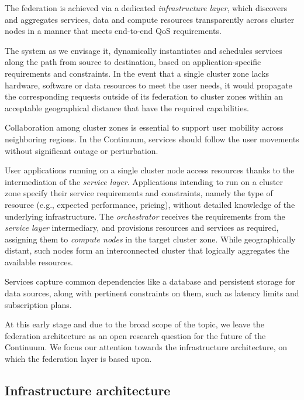 The federation is achieved via a dedicated \textit{infrastructure layer}, which discovers and aggregates services, data and compute resources transparently across cluster nodes in a manner that meets end-to-end QoS requirements.

The system as we envisage it, dynamically instantiates and schedules services along the path from source to destination, based on application-specific requirements and constraints. 
In the event that a single cluster zone lacks hardware, software or data resources to meet the user needs, it would propagate the corresponding requests outside of its federation to cluster zones within an acceptable geographical distance that have the required capabilities.

Collaboration among cluster zones is essential to support user mobility across neighboring regions. 
In the Continuum, services should follow the user movements without significant outage or perturbation.

User applications running on a single cluster node access resources thanks to the intermediation of the \textit{service layer}. Applications intending to run on a cluster zone specify their service requirements and constraints, namely the type of resource (e.g., expected performance, pricing), without detailed knowledge of the underlying infrastructure. 
The \textit{orchestrator} receives the requirements from the \textit{service layer} intermediary, and provisions resources and services as required, assigning them to \textit{compute nodes} in the target cluster zone.
While geographically distant, such nodes form an interconnected cluster that logically aggregates the available resources.

Services capture common dependencies like a database and persistent storage for data sources, along with pertinent constraints on them, such as latency limits and subscription plans.

At this early stage and due to the broad scope of the topic, we leave the federation architecture as an open research question for the future of the Continuum. We focus our attention towards the infrastructure architecture, on which the federation layer is based upon.

\subsection{Infrastructure architecture}

